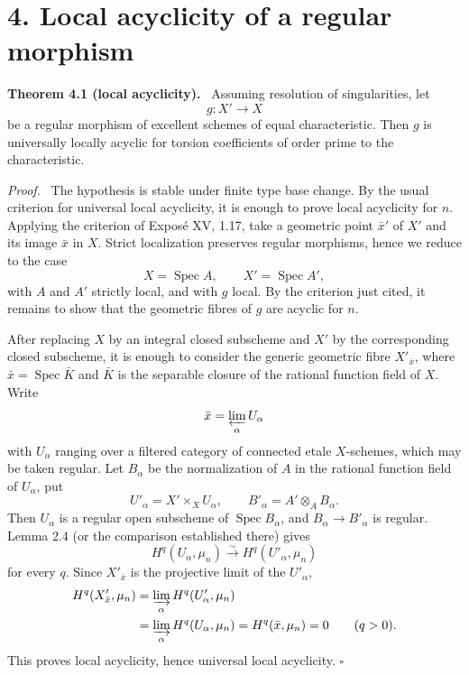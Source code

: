 \documentclass[12pt]{article}
\DeclareMathOperator{\Spec}{Spec}
\newcommand{\qedtext}{\hfill\(\square\)}
\newenvironment{statement}[1]{\par\medskip\noindent\textbf{#1.}\ }{\par\medskip}
\newenvironment{prooftext}[1][Proof]{\par\noindent\emph{#1.}\ }{\par\medskip}
\begin{document}
\section*{4. Local acyclicity of a regular morphism}

\begin{statement}{Theorem 4.1 (local acyclicity)}
Assuming resolution of singularities, let
\[
   g:X'\longrightarrow X
\]
be a regular morphism of excellent schemes of equal characteristic. Then $g$ is universally locally acyclic for torsion coefficients of order prime to the characteristic.
\end{statement}

\begin{prooftext}
The hypothesis is stable under finite type base change. By the usual criterion for universal local acyclicity, it is enough to prove local acyclicity for $n$. Applying the criterion of Expos\'e XV, 1.17, take a geometric point $\bar x'$ of $X'$ and its image $\bar x$ in $X$. Strict localization preserves regular morphisms, hence we reduce to the case
\[
   X=\Spec A,
   \qquad X'=\Spec A',
\]
with $A$ and $A'$ strictly local, and with $g$ local. By the criterion just cited, it remains to show that the geometric fibres of $g$ are acyclic for $n$.

After replacing $X$ by an integral closed subscheme and $X'$ by the corresponding closed subscheme, it is enough to consider the generic geometric fibre $X'_{\bar x}$, where $\bar x=\Spec\bar K$ and $\bar K$ is the separable closure of the rational function field of $X$. Write
\[
   \bar x=\varprojlim_\alpha U_\alpha
\]
with $U_\alpha$ ranging over a filtered category of connected etale $X$-schemes, which may be taken regular. Let $B_\alpha$ be the normalization of $A$ in the rational function field of $U_\alpha$, put
\[
   U'_
\alpha=X'\times_XU_\alpha,
   \qquad B'_
\alpha=A'\otimes_AB_\alpha.
\]
Then $U_\alpha$ is a regular open subscheme of $\Spec B_\alpha$, and $B_\alpha\to B'_
\alpha$ is regular. Lemma 2.4 (or the comparison established there) gives
\[
   H^q(U_\alpha,\mu_n)\xrightarrow{\sim}H^q(U'_
\alpha,\mu_n)
\]
for every $q$. Since $X'_{\bar x}$ is the projective limit of the $U'_
\alpha$,
\begin{align*}
H^q(X'_{\bar x},\mu_n)
&=\varinjlim_
\alpha H^q(U'_
\alpha,\mu_n)\\
&=\varinjlim_
\alpha H^q(U_\alpha,\mu_n)
 =H^q(\bar x,\mu_n)=0\qquad(q>0).
\end{align*}
This proves local acyclicity, hence universal local acyclicity. \qedtext
\end{prooftext}
\end{document}
